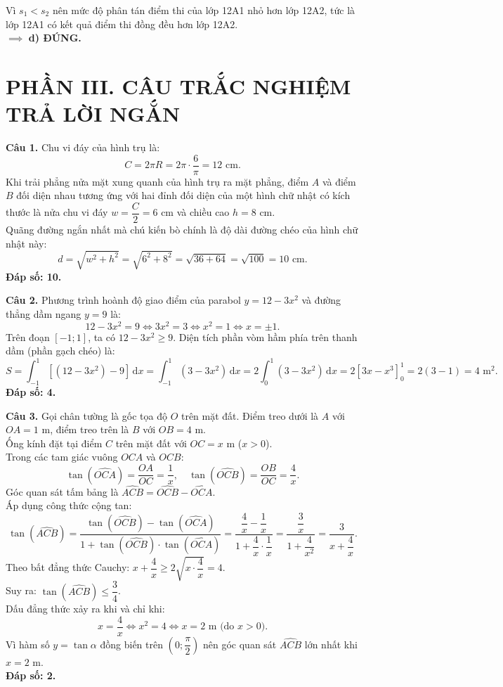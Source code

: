 \documentclass[12pt,a4paper]{article}
\begin{document}
Vì $s_1 < s_2$ nên mức độ phân tán điểm thi của lớp 12A1 nhỏ hơn lớp 12A2, tức là lớp 12A1 có kết quả điểm thi đồng đều hơn lớp 12A2.\\
$\implies$ \textbf{d) ĐÚNG.}

\vspace{0.4cm}
\section*{\large PHẦN III. CÂU TRẮC NGHIỆM TRẢ LỜI NGẮN}

\noindent\textbf{Câu 1.} Chu vi đáy của hình trụ là:
\[
C = 2\pi R = 2\pi \cdot \dfrac{6}{\pi} = 12\text{ cm}.
\]
Khi trải phẳng nửa mặt xung quanh của hình trụ ra mặt phẳng, điểm $A$ và điểm $B$ đối diện nhau tương ứng với hai đỉnh đối diện của một hình chữ nhật có kích thước là nửa chu vi đáy $w = \dfrac{C}{2} = 6\text{ cm}$ và chiều cao $h = 8\text{ cm}$.\\
Quãng đường ngắn nhất mà chú kiến bò chính là độ dài đường chéo của hình chữ nhật này:
\[
d = \sqrt{w^2 + h^2} = \sqrt{6^2 + 8^2} = \sqrt{36 + 64} = \sqrt{100} = 10\text{ cm}.
\]
\textbf{Đáp số: 10.}

\vspace{0.3cm}
\noindent\textbf{Câu 2.} Phương trình hoành độ giao điểm của parabol $y = 12 - 3x^2$ và đường thẳng dầm ngang $y = 9$ là:
\[
12 - 3x^2 = 9 \iff 3x^2 = 3 \iff x^2 = 1 \iff x = \pm 1.
\]
Trên đoạn $[-1; 1]$, ta có $12 - 3x^2 \ge 9$. Diện tích phần vòm hầm phía trên thanh dầm (phần gạch chéo) là:
\[
S = \int_{-1}^1 \left[ (12 - 3x^2) - 9 \right]\,\text{d}x = \int_{-1}^1 (3 - 3x^2)\,\text{d}x = 2\int_0^1 (3 - 3x^2)\,\text{d}x = 2 \left[ 3x - x^3 \right]_0^1 = 2(3 - 1) = 4\text{ m}^2.
\]
\textbf{Đáp số: 4.}

\vspace{0.3cm}
\noindent\textbf{Câu 3.} Gọi chân tường là gốc tọa độ $O$ trên mặt đất. Điểm treo dưới là $A$ với $OA = 1\text{ m}$, điểm treo trên là $B$ với $OB = 4\text{ m}$.\\
Ống kính đặt tại điểm $C$ trên mặt đất với $OC = x\text{ m}$ ($x > 0$).\\
Trong các tam giác vuông $OCA$ và $OCB$:
\[
\tan(\widehat{OCA}) = \dfrac{OA}{OC} = \dfrac{1}{x},\quad \tan(\widehat{OCB}) = \dfrac{OB}{OC} = \dfrac{4}{x}.
\]
Góc quan sát tấm bảng là $\widehat{ACB} = \widehat{OCB} - \widehat{OCA}$.\\
Áp dụng công thức cộng tan:
\[
\tan(\widehat{ACB}) = \dfrac{\tan(\widehat{OCB}) - \tan(\widehat{OCA})}{1 + \tan(\widehat{OCB}) \cdot \tan(\widehat{OCA})} = \dfrac{\dfrac{4}{x} - \dfrac{1}{x}}{1 + \dfrac{4}{x} \cdot \dfrac{1}{x}} = \dfrac{\dfrac{3}{x}}{1 + \dfrac{4}{x^2}} = \dfrac{3}{x + \dfrac{4}{x}}.
\]
Theo bất đẳng thức Cauchy: $x + \dfrac{4}{x} \ge 2\sqrt{x \cdot \dfrac{4}{x}} = 4$.\\
Suy ra: $\tan(\widehat{ACB}) \le \dfrac{3}{4}$.\\
Dấu đẳng thức xảy ra khi và chỉ khi:
\[
x = \dfrac{4}{x} \iff x^2 = 4 \iff x = 2\text{ m} \text{ (do } x > 0\text{)}.
\]
Vì hàm số $y = \tan\alpha$ đồng biến trên $\left(0; \dfrac{\pi}{2}\right)$ nên góc quan sát $\widehat{ACB}$ lớn nhất khi $x = 2\text{ m}$.\\
\textbf{Đáp số: 2.}
\end{document}

